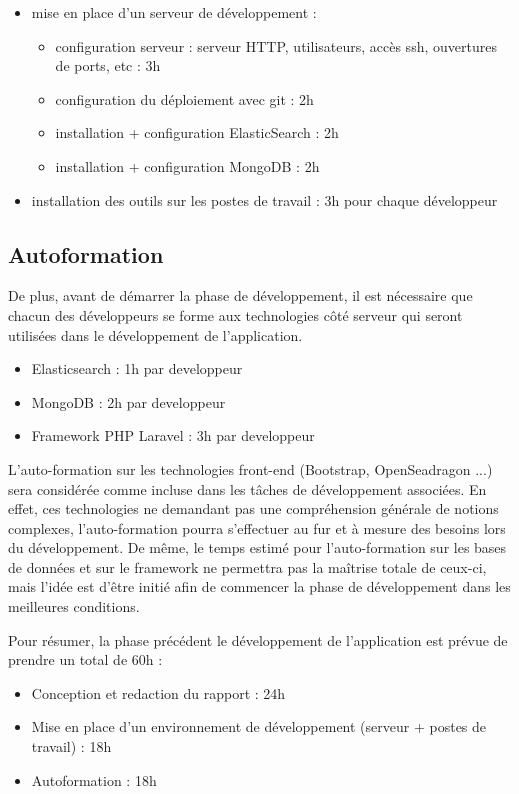         \begin{itemize}
            \item mise en place d'un serveur de développement :
            \begin{itemize}
                \item configuration serveur : serveur HTTP, utilisateurs, accès ssh, ouvertures de ports, etc : 3h
                \item configuration du déploiement avec git : 2h
                \item installation + configuration ElasticSearch : 2h
                \item installation + configuration MongoDB : 2h
            \end{itemize}
            \item installation des outils sur les postes de travail : 3h pour chaque développeur
        \end{itemize}

    \subsection{Autoformation}
    \label{subsec:autoform}
        De plus, avant de démarrer la phase de développement, il est nécessaire que chacun des développeurs se forme aux technologies côté serveur qui seront utilisées dans le développement de l'application.

        \begin{itemize}
            \item Elasticsearch : 1h par developpeur
            \item MongoDB : 2h par developpeur
            \item Framework PHP Laravel : 3h par developpeur
        \end{itemize}

        L'auto-formation sur les technologies front-end (Bootstrap, OpenSeadragon ...) sera considérée comme incluse dans les tâches de développement associées. En effet, ces technologies ne demandant pas une compréhension générale de notions complexes, l'auto-formation pourra s'effectuer au fur et à mesure des besoins lors du développement. De même, le temps estimé pour l'auto-formation sur les bases de données et sur le framework ne permettra pas la maîtrise totale de ceux-ci, mais l'idée est d'être initié afin de commencer la phase de développement dans les meilleures conditions.

        Pour résumer, la phase précédent le développement de l'application est prévue de prendre un total de 60h :
        \begin{itemize}
            \item Conception et redaction du rapport : 24h
            \item Mise en place d'un environnement de développement (serveur + postes de travail) : 18h
            \item Autoformation : 18h
        \end{itemize}